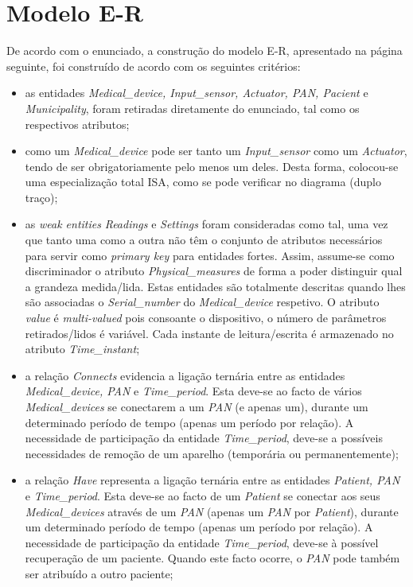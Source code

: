 \documentclass[a4paper]{article}
\begin{document}


\section{Modelo E-R}
De acordo com o enunciado, a construção do modelo E-R, apresentado na página seguinte, foi construído de acordo com os seguintes critérios:
\begin{itemize}

	\item as entidades \textit{Medical\_device, Input\_sensor, Actuator, 
	PAN, Pacient} e \textit{Municipality}, foram retiradas diretamente do enunciado, tal como os respectivos atributos;
	
	\item como um \textit{Medical\_device} pode ser tanto um \textit{Input\_sensor} 
	como um \textit{Actuator}, tendo de ser obrigatoriamente pelo menos um deles.
	Desta forma, colocou-se uma especialização total ISA, como se pode verificar no diagrama (duplo traço);

	\item as \textit{weak entities} \textit{Readings} e \textit{Settings} foram consideradas como tal, uma vez que tanto uma como a outra não têm o
	conjunto de atributos necessários para servir como \textit{primary key} para entidades fortes. Assim, assume-se como discriminador 
	o atributo \textit{Physical\_measures} de forma a poder distinguir qual a grandeza medida/lida. Estas entidades são totalmente
	descritas quando lhes são associadas o \textit{Serial\_number} do \textit{Medical\_device} respetivo. O atributo \textit{value} é
	\textit{multi-valued} pois consoante o dispositivo, o número de parâmetros retirados/lidos é variável. Cada instante de 
	leitura/escrita é 
	armazenado no atributo \textit{Time\_instant};
	
	\item a relação \textit{Connects} evidencia a ligação ternária entre as entidades \textit{Medical\_device, PAN} e 
	\textit{Time\_period}. Esta deve-se ao facto de vários \textit{Medical\_devices} se conectarem a um \textit{PAN} (e apenas um),
	 durante um determinado período de tempo (apenas um período por relação). A necessidade de participação da entidade \textit{Time\_period}, deve-se a possíveis
	 necessidades de remoção de um aparelho (temporária ou permanentemente);
	 
	\item a relação \textit{Have} representa a ligação ternária entre as entidades \textit{Patient, PAN} e 
	\textit{Time\_period}. Esta deve-se ao facto de um \textit{Patient} se conectar aos seus \textit{Medical\_devices}
	através de um \textit{PAN} (apenas um \textit{PAN} por \textit{Patient}),
	 durante um determinado período de tempo (apenas um período por relação). A necessidade de participação da entidade \textit{Time\_period}, deve-se à possível recuperação de
	 um paciente. Quando este facto ocorre, o \textit{PAN} pode também ser atribuído a outro paciente;
	 

\end{itemize}
\end{document}
